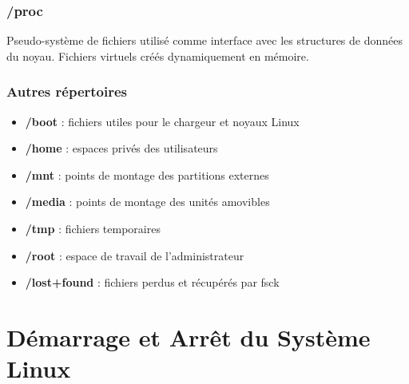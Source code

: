 \documentclass[12pt,a4paper]{article}
\begin{document}

\subsubsection{/proc}
Pseudo-syst\`eme de fichiers utilis\'e comme interface avec les structures de donn\'ees du noyau. Fichiers virtuels cr\'e\'es dynamiquement en m\'emoire.

\subsubsection{Autres r\'epertoires}
\begin{itemize}
    \item \textbf{/boot} : fichiers utiles pour le chargeur et noyaux Linux
    \item \textbf{/home} : espaces priv\'es des utilisateurs
    \item \textbf{/mnt} : points de montage des partitions externes
    \item \textbf{/media} : points de montage des unit\'es amovibles
    \item \textbf{/tmp} : fichiers temporaires
    \item \textbf{/root} : espace de travail de l'administrateur
    \item \textbf{/lost+found} : fichiers perdus et r\'ecup\'er\'es par fsck
\end{itemize}


\section{D\'emarrage et Arr\^et du Syst\`eme Linux}
\end{document}
